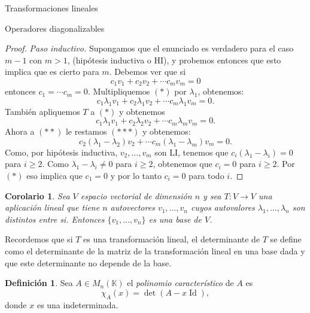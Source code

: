 \documentclass[a4paper,12pt,twoside,spanish,reqno]{amsbook}
\numberwithin{equation}{section}
\newtheorem{corolario}[teorema]{Corolario}
\theoremstyle{definition}
\newtheorem{definicion}[teorema]{Definici\'on}
\theoremstyle{remark}
\newcommand{\Id}{\operatorname{Id}}
\newcommand{\K}{\mathbb K}
\begin{document}
\begin{chapter}{Transformaciones lineales}
\begin{section}{Operadores diagonalizables}
\begin{proof}
            \textit{Paso inductivo.} Supongamos que el enunciado es verdadero para el caso $m-1$ con $m>1$, (hipótesis inductiva o HI), y probemos entonces que esto implica que es cierto para $m$. Debemos ver  que si 
            \begin{equation}
            c_1v_1+	c_2v_2+ \cdots c_mv_m = 0 \tag{$*$}
            \end{equation}
            entonces $c_1 = \cdots c_m = 0$.
            Multipliquemos $(*)$ por $\lambda_1$, obtenemos:
            \begin{equation}
            c_1\lambda_1v_1+ c_2\lambda_1v_2+\cdots c_m\lambda_1v_m = 0. \tag{$**$}
            \end{equation}
            También apliquemos $T$ a $(*)$ y obtenemos
            \begin{equation}
            c_1\lambda_1v_1+ c_2\lambda_2v_2+\cdots c_m\lambda_mv_m = 0. \tag{$***$}
            \end{equation}
            Ahora a $(**)$ le restamos $(***)$ y obtenemos:
            \begin{equation}
            c_2(\lambda_1 -\lambda_2)v_2+\cdots c_m(\lambda_1 -\lambda_m)v_m = 0. 	 
            \end{equation}
            Como, por hipótesis inductiva, $v_2,\ldots,v_m$ son LI, tenemos que $c_i(\lambda_1 -\lambda_i)=0$ para $i\ge 2$. Como $\lambda_1 -\lambda_i \ne 0$ para $i\ge 2$, obtenemos que $c_i = 0$ para $i\ge 2$. Por $(*)$ eso implica que $c_1=0$ y por lo tanto $c_i=0$ para todo $i$.
        \end{proof}
        
        \begin{corolario}\label{cor-aut-li}
            Sea $V$ espacio vectorial de dimensión $n$ y sea $T: V \to V$ una aplicación lineal que tiene $n$
            autovectores $v_1,\ldots, v_n$ cuyos autovalores $\lambda_1,\ldots,\lambda_n$ son distintos entre
            si. Entonces $\{v_1,\ldots, v_n\}$ es una base de $V$.
        \end{corolario}
        
        Recordemos que si $T$  es una transformación lineal, el determinante de $T$  se define como el determinante de la matriz de la transformación lineal en una base dada y que este determinante no depende de la base.    
        
        \begin{definicion}
            Sea $A \in M_n(\K)$   el \textit{polinomio característico} de $A$ es $$\chi_A(x) = \det(A-x \Id),$$ donde $x$ es una indeterminada. 
            

\end{definicion}
\end{section}
\end{chapter}
\end{document}
